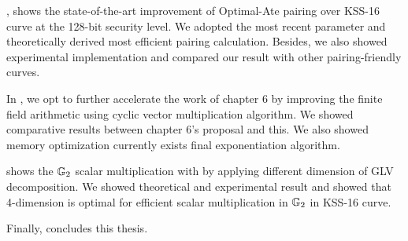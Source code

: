 , shows the state-of-the-art improvement of Optimal-Ate pairing over KSS-16 curve at the 128-bit security level.
We adopted the most recent parameter and theoretically derived most efficient pairing calculation.
Besides, we also showed experimental implementation and compared our result with other pairing-friendly curves.


In , we opt to further accelerate the work of chapter 6 by improving the finite field arithmetic using cyclic vector multiplication algorithm.
We showed comparative results between chapter 6's proposal and this. 
We also showed memory optimization currently exists final exponentiation algorithm.

 shows the   ${\mathbb{G}}_{2}$  scalar multiplication with by applying different dimension of GLV decomposition.
We showed theoretical and experimental result and showed that 4-dimension is optimal for efficient scalar multiplication in  ${\mathbb{G}}_{2}$ in KSS-16 curve.

Finally,  concludes this thesis.


	
